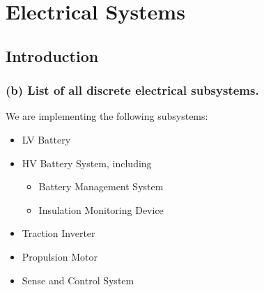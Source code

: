 \chapter{Electrical Systems}
\graphicspath{ {./texfiles/electrical/eimc/} }
\section{Introduction}

\subsection{(b) List of all discrete electrical subsystems.}
We are implementing the following subsystems: 
\begin{itemize}
    \item LV Battery
    \item HV Battery System, including \begin{itemize}
        \item Battery Management System
        \item Insulation Monitoring Device
    \end{itemize}
    \item Traction Inverter
    \item Propulsion Motor    
    \item Sense and Control System
\end{itemize}

